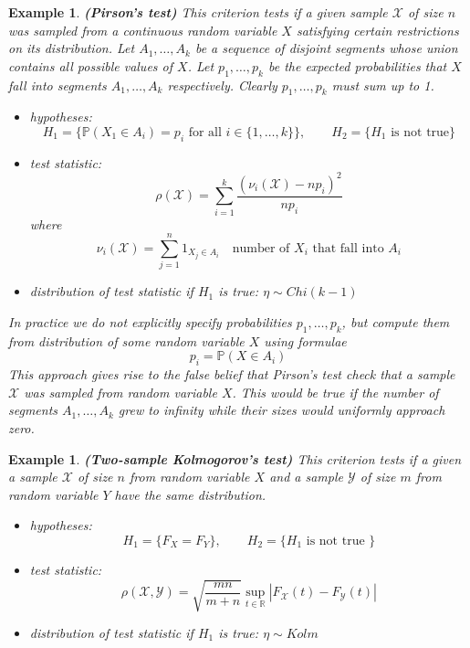 \documentclass[12pt]{article}
\newtheorem{example}[theorem]{Example}
\begin{document}
\begin{example} \textbf{(Pirson's test)} This criterion tests if a given sample
    $\mathscr{X}$ of size $n$ was sampled from a continuous random variable $X$
    satisfying certain restrictions on its distribution. Let $A_1,\ldots,A_k$ be
    a sequence of disjoint segments whose union contains all possible values of
    $X$. Let $p_1,\ldots,p_k$ be the expected probabilities that $X$ fall into
    segments $A_1,\ldots,A_k$ respectively. Clearly $p_1,\ldots,p_k$ must sum up
    to 1.
    \begin{itemize}
        \item hypotheses:
              $$H_1=\{\mathbb{P}(X_1\in A_i)=p_i\mbox{ for all }
                  i\in \{1,\ldots,k\} \},\quad\quad H_2=\{H_1\mbox{ is not
                      true}\}$$
        \item test statistic:
              $$\rho(\mathscr{X})=\sum_{i=1}^k
                  \frac{{(\nu_i(\mathscr{X})-np_i)}^2}{n p_i}
              $$
              where
              $$
                  \nu_i(\mathscr{X})
                  =\sum_{j=1}^n 1_{X_j\in A_i}
                  \quad\mbox{number of }X_i\mbox{ that fall into }A_i
              $$
        \item distribution of test statistic if $H_1$ is true:
              $\eta\sim Chi(k-1)$
    \end{itemize}
    In practice we do not explicitly specify probabilities
    $p_1,\ldots,p_k$, but compute them from distribution of some
    random variable $X$ using formulae
    $$
        p_i=\mathbb{P}(X\in A_i)
    $$
    This approach gives rise to the false belief that Pirson's test check
    that a sample $\mathscr{X}$ was sampled from random variable $X$.
    This would be true if the number of segments $A_1,\ldots,A_k$ grew to
    infinity while their sizes would uniformly approach zero.
\end{example}

\begin{example} \textbf{(Two-sample Kolmogorov's test)} This criterion tests
    if a given a sample $\mathscr{X}$ of size $n$ from random variable $X$
    and a sample $\mathscr{Y}$ of size $m$ from random variable $Y$
    have the same distribution.
    \begin{itemize}
        \item hypotheses:
              $$
                  H_1=\{F_X=F_Y\},\quad\quad H_2=\{H_1\mbox{ is not true }\}
              $$
        \item test statistic:
              $$
                  \rho(\mathscr{X},\mathscr{Y})
                  =\sqrt{\frac{mn}{m+n}}
                  \sup_{t\in\mathbb{R}}|F_{\mathscr{X}}(t)-F_{\mathscr{Y}}(t)|
              $$
        \item distribution of test statistic if $H_1$ is true: $\eta\sim Kolm$
    \end{itemize}
\end{example}
\end{document}
